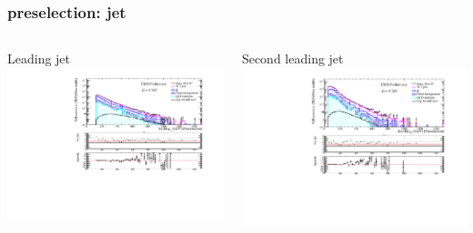 \documentclass[bigger]{beamer}
\begin{document}
\begin{frame}
\frametitle{\enujj preselection: jet \pt}
\label{sec-1-2-2}
\begin{columns}
\begin{column}{0.6\textwidth}
\label{sec-1-2-2-1}

\centering
Leading jet \pt
\includegraphics[width=\textwidth]{fig/enu/preselection/Pt1stJet_PAS_enujj.pdf}
\end{column}
\begin{column}{0.6\textwidth}
\label{sec-1-2-2-2}

\centering
Second leading jet \pt
\includegraphics[width=\textwidth]{fig/enu/preselection/Pt2ndJet_PAS_enujj.pdf}
\end{column}
\end{columns}
\end{frame}
\end{document}

